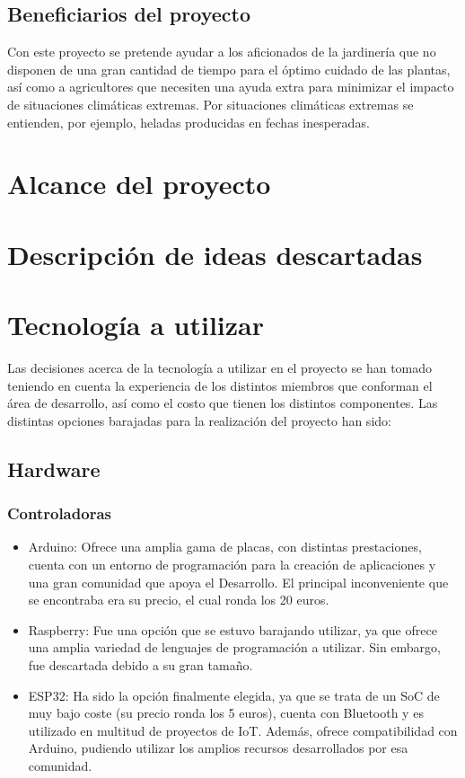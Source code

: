 \documentclass[runningheads]{llncs}
\begin{document}
    \subsection{Beneficiarios del proyecto}
    Con este proyecto se pretende ayudar a los aficionados de la jardinería que no disponen de una gran cantidad de tiempo para el óptimo cuidado de las plantas, así como a agricultores que necesiten una ayuda extra para minimizar el impacto de situaciones climáticas extremas. Por situaciones climáticas extremas se entienden, por ejemplo, heladas producidas en fechas inesperadas.
    
\section{Alcance del proyecto}

\section{Descripción de ideas descartadas}

\section{Tecnología a utilizar}
Las decisiones acerca de la tecnología a utilizar en el proyecto se han tomado teniendo en cuenta la experiencia de los distintos miembros que conforman el área de desarrollo, así como el costo que tienen los distintos componentes.
\newline
Las distintas opciones barajadas para la realización del proyecto han sido:

\subsection*{Hardware}
\subsubsection*{Controladoras}
\begin{itemize}
    \item Arduino: Ofrece una amplia gama de placas, con distintas prestaciones, cuenta con un entorno de programación para la creación de aplicaciones y una gran comunidad que apoya el Desarrollo. El principal inconveniente que se encontraba era su precio, el cual ronda los 20 euros.
    
    \item Raspberry: Fue una opción que se estuvo barajando utilizar, ya que ofrece una amplia variedad de lenguajes de programación a utilizar. Sin embargo, fue descartada debido a su gran tamaño.
    
    \item ESP32: Ha sido la opción finalmente elegida, ya que se trata de un SoC de muy bajo coste (su precio ronda los 5 euros), cuenta con Bluetooth y es utilizado en multitud de proyectos de IoT. Además, ofrece compatibilidad con Arduino, pudiendo utilizar los amplios recursos desarrollados por esa comunidad.
\end{itemize}
\end{document}
